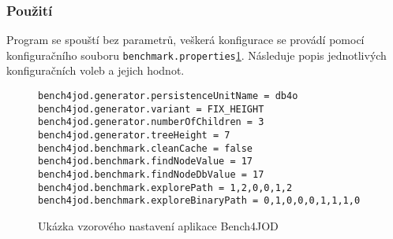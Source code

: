 \subsubsection{Použití}
Program se spouští bez parametrů, veškerá konfigurace se provádí pomocí konfiguračního souboru \texttt{benchmark.properties}\ref{bench4jod:prop:eg}. Následuje popis jednotlivých konfiguračních voleb a jejich hodnot.
\begin{figure}[!h]
\begin{lstlisting}
bench4jod.generator.persistenceUnitName = db4o
bench4jod.generator.variant = FIX_HEIGHT
bench4jod.generator.numberOfChildren = 3
bench4jod.generator.treeHeight = 7
bench4jod.benchmark.cleanCache = false
bench4jod.benchmark.findNodeValue = 17
bench4jod.benchmark.findNodeDbValue = 17
bench4jod.benchmark.explorePath = 1,2,0,0,1,2
bench4jod.benchmark.exploreBinaryPath = 0,1,0,0,0,1,1,1,0  
\end{lstlisting}
\caption{Ukázka vzorového nastavení aplikace Bench4JOD}\label{bench4jod:prop:eg}
\end{figure}
